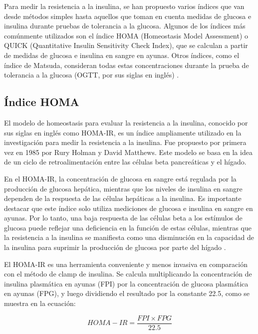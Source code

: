 Para medir la resistencia a la insulina, se han propuesto varios índices que van desde métodos simples hasta aquellos que toman en cuenta medidas de glucosa e insulina durante pruebas de tolerancia a la glucosa. Algunos de los índices más comúnmente utilizados son el índice HOMA (Homeostasis Model Assessment) o QUICK (Quantitative Insulin Sensitivity Check Index), que se calculan a partir de medidas de glucosa e insulina en sangre en ayunas. Otros índices, como el índice de Matsuda, consideran todas estas concentraciones durante la prueba de tolerancia a la glucosa (OGTT, por sus siglas en inglés) \cite{MedicionEstimacion}.




\subsection{Índice HOMA}

El modelo de homeostasis para evaluar la resistencia a la insulina, conocido por sus siglas en inglés como HOMA-IR, es un índice ampliamente utilizado en la investigación para medir la resistencia a la insulina. Fue propuesto por primera vez en 1985 por Rury Holman y David Matthews. Este modelo se basa en la idea de un ciclo de retroalimentación entre las células beta pancreáticas y el hígado.

En el HOMA-IR, la concentración de glucosa en sangre está regulada por la producción de glucosa hepática, mientras que los niveles de insulina en sangre dependen de la respuesta de las células hepáticas a la insulina. Es importante destacar que este índice solo utiliza mediciones de glucosa e insulina en sangre en ayunas. Por lo tanto, una baja respuesta de las células beta a los estímulos de glucosa puede reflejar una deficiencia en la función de estas células, mientras que la resistencia a la insulina se manifiesta como una disminución en la capacidad de la insulina para suprimir la producción de glucosa por parte del hígado \cite{indicesRes}.

El HOMA-IR es una herramienta conveniente y menos invasiva en comparación con el método de clamp de insulina. Se calcula multiplicando la concentración de insulina plasmática en ayunas (FPI) por la concentración de glucosa plasmática en ayunas (FPG), y luego dividiendo el resultado por la constante 22.5, como se muestra en la ecuación:

\begin{equation}\label{HOMAIR}
    HOMA-IR = \frac{FPI \times FPG}{22.5}
\end{equation}

